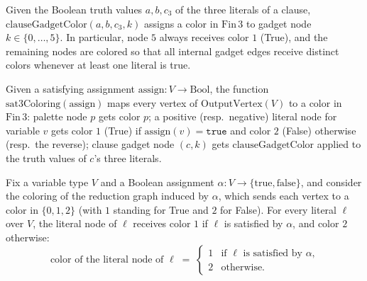 \begin{definition}
\label{SATtoColor.clauseGadgetColor}
\leanok
Given the Boolean truth values $a, b, c_3$ of the three literals of a clause,
$\mathrm{clauseGadgetColor}(a, b, c_3, k)$ assigns a color in $\mathrm{Fin}\,3$
to gadget node $k \in \{0,\ldots,5\}$.  In particular, node $5$ always receives
color $1$ (True), and the remaining nodes are colored so that all internal
gadget edges receive distinct colors whenever at least one literal is true.
\end{definition}

\begin{definition}
\label{SATtoColor.sat3Coloring}
\leanok
{}
Given a satisfying assignment $\mathrm{assign} : V \to \mathrm{Bool}$, the
function $\mathrm{sat3Coloring}(\mathrm{assign})$ maps every vertex of
$\mathrm{OutputVertex}(V)$ to a color in $\mathrm{Fin}\,3$: palette node $p$
gets color $p$; a positive (resp.\ negative) literal node for variable $v$
gets color $1$ (True) if $\mathrm{assign}(v) = \texttt{true}$ and color $2$
(False) otherwise (resp.\ the reverse); clause gadget node $(c, k)$ gets
$\mathrm{clauseGadgetColor}$ applied to the truth values of $c$'s three
literals.
\end{definition}

\begin{lemma}
\label{SATtoColor.sat3Coloring_litNode}
\leanok
{}
Fix a variable type $V$ and a Boolean assignment $\alpha : V \to \{\text{true},
\text{false}\}$, and consider the coloring of the reduction graph induced by $\alpha$,
which sends each vertex to a color in $\{0, 1, 2\}$ (with $1$ standing for True and $2$
for False). For every literal $\ell$ over $V$, the literal node of $\ell$ receives color
$1$ if $\ell$ is satisfied by $\alpha$, and color $2$ otherwise:
\[
  \text{color of the literal node of } \ell
  \;=\;
\begin{cases} 1 & \text{if $\ell$ is satisfied by $\alpha$,}\\ 2 &
\text{otherwise.}\end{cases}
\]
\end{lemma}

